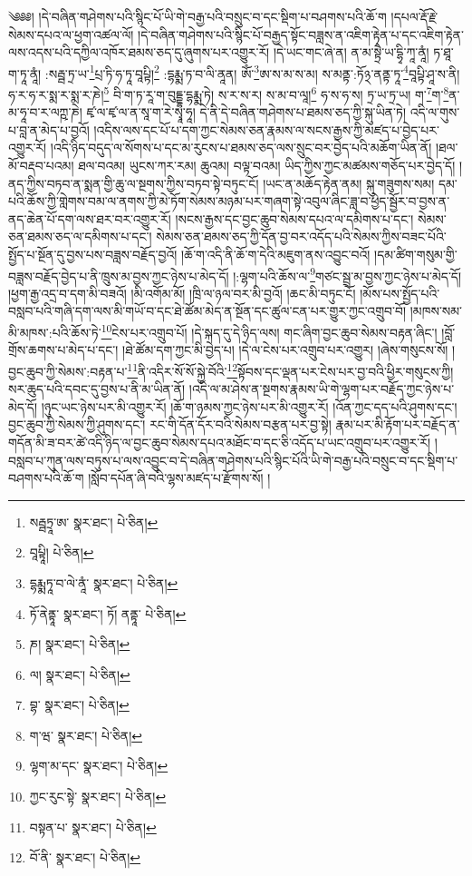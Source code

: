 \setcounter{footnote}{0} 
༄༅༅། །དེ་བཞིན་གཤེགས་པའི་སྙིང་པོ་ཡི་གེ་བརྒྱ་པའི་བསྲུང་བ་དང་སྡིག་པ་བཤགས་པའི་ཆོ་ག །དཔལ་རྡོ་རྗེ་སེམས་དཔའ་ལ་ཕྱག་འཚལ་ལོ། །དེ་བཞིན་གཤེགས་པའི་སྙིང་པོ་བརྒྱད་སྟོང་བཟླས་ན་འཇིག་རྟེན་པ་དང་འཇིག་རྟེན་ལས་འདས་པའི་དཀྱིལ་འཁོར་ཐམས་ཅད་དུ་ཞུགས་པར་འགྱུར་རོ། །དེ་ཡང་གང་ཞེ་ན། ན་མ་སྟྲཻ་ཡ་དྷྭི་ཀཱ་ནཱཾ། ཏ་ཐཱ་ག་ཏཱ་ནཱཾ། :སརྦྦ་ཏྲ་ཡ་\footnote{སརྦྦཏྲཱ་ཨ་  སྣར་ཐང་།  པེ་ཅིན། }པྲ་ཏི་ཧ་ཏཱ་བཱཔྟི།\footnote{བཱཔྟཱི།  པེ་ཅིན། } :དྷརྨྨ་ཏ་བ་ལི་ནཱན། ཨོཾ་\footnote{དྷརྨྨཏཱ་བ་ལེ་ནཱཾ་  སྣར་ཐང་།  པེ་ཅིན། }ཨ་ས་མ་ས་མ། ས་མནྟ་:ཏོ྅་ནནྟ་ཏཱ་\footnote{ཏོ་ནེནྟཱ་  སྣར་ཐང་། ཏོ། ནནྟཱ་  པེ་ཅིན། }བཱཔྟི་ཤཱ་ས་ནི། ཧ་ར་ཧ་ར་སྨ་ར་སྨ་ར་ཎེ།\footnote{ཎ།  སྣར་ཐང་།  པེ་ཅིན། } བི་ག་ཏ་རཱ་ག་བུདྡྷ་དྷརྨྨ་ཏེ། ས་ར་ས་ར། ས་མ་བ་ལཱ།\footnote{ལ།  སྣར་ཐང་།  པེ་ཅིན། } ཧ་ས་ཧ་ས། ཏྲ་ཡ་ཏྲ་ཡ། ག་\footnote{བྷ་  སྣར་ཐང་།  པེ་ཅིན། }ག་\footnote{ག་ཝ་  སྣར་ཐང་།  པེ་ཅིན། }ན་མ་ཧཱ་བ་ར་ལཀྵ་ཎེ། ཛྭ་ལ་ཛྭ་ལ་ན་སཱ་ག་རེ་སྭཱ་ཧཱ། དེ་ནི་དེ་བཞིན་གཤེགས་པ་ཐམས་ཅད་ཀྱི་སྐུ་ཡིན་ཏེ། འདི་ལ་གུས་པ་བླ་ན་མེད་པ་བྱའོ། །འདིས་ལས་དང་པོ་པ་དག་ཀྱང་སེམས་ཅན་རྣམས་ལ་སངས་རྒྱས་ཀྱི་མཛད་པ་བྱེད་པར་འགྱུར་རོ། །འདི་ཉིད་བདུད་ལ་སོགས་པ་དང་མ་རུངས་པ་ཐམས་ཅད་ལས་སྲུང་བར་བྱེད་པའི་མཆོག་ཡིན་ནོ། །ཐལ་མོ་བརྡབ་པའམ། ཐལ་བའམ། ཡུངས་ཀར་རམ། ཆུའམ། བལྟ་བའམ། ཡིད་ཀྱིས་ཀྱང་མཚམས་གཅོད་པར་བྱེད་དོ། །ནད་ཀྱིས་བཏབ་ན་སྨན་གྱི་ཆུ་ལ་སྔགས་ཀྱིས་བཏབ་སྟེ་བཏུང་ངོ། །ཡང་ན་མཆོད་རྟེན་ནམ། སྐུ་གཟུགས་སམ། དམ་པའི་ཆོས་ཀྱི་གླེགས་བམ་ལ་ནགས་ཀྱི་མེ་ཏོག་སེམས་མཉམ་པར་གཞག་སྟེ་འབུལ་ཞིང་ཟླ་བ་ཕྱེད་སྦྱོར་བ་བྱས་ན་ནད་ཆེན་པོ་དག་ལས་ཐར་བར་འགྱུར་རོ། །སངས་རྒྱས་དང་བྱང་ཆུབ་སེམས་དཔའ་ལ་དམིགས་པ་དང་། སེམས་ཅན་ཐམས་ཅད་ལ་དམིགས་པ་དང་། སེམས་ཅན་ཐམས་ཅད་ཀྱི་དོན་བྱ་བར་འདོད་པའི་སེམས་ཀྱིས་བཟང་པོའི་སྤྱོད་པ་སྔོན་དུ་བྱས་པས་བཟླས་བརྗོད་བྱའོ། །ཆོ་ག་འདི་ནི་ཆོ་ག་དེའི་མཇུག་ནས་འབྱུང་བའོ། །དམ་ཚིག་གསུམ་གྱི་བཟླས་བརྗོད་བྱེད་པ་ནི་ཁྲུས་མ་བྱས་ཀྱང་ཉེས་པ་མེད་དོ། །:ལྷག་པའི་ཆོས་ལ་\footnote{ལྷག་མ་དང་  སྣར་ཐང་།  པེ་ཅིན། }གཙང་སྦྲ་མ་བྱས་ཀྱང་ཉེས་པ་མེད་དོ། །ཕྱག་རྒྱ་འདྲ་བ་དག་མི་བཟའོ། །མི་འགོམ་མོ། །ཁྲི་ལ་ཉལ་བར་མི་བྱའོ། །ཆང་མི་བཏུང་ངོ། །མོས་པས་སྤྱོད་པའི་བསླབ་པའི་གཞི་དག་ལས་མི་གཡོ་བ་དང་ཐེ་ཚོམ་མེད་ན་སྔོན་དང་ཚུལ་ངན་པར་གྱུར་ཀྱང་འགྲུབ་བོ། །མཁས་སམ་མི་མཁས་:པའི་ཆོས་ཏེ་\footnote{ཀྱང་རུང་སྟེ་  སྣར་ཐང་།  པེ་ཅིན། }ངེས་པར་འགྲུབ་པོ། །དེ་སྐད་དུ་དེ་ཉིད་ལས། གང་ཞིག་བྱང་ཆུབ་སེམས་བརྟན་ཞིང་། །བློ་གྲོས་ཆགས་པ་མེད་པ་དང་། །ཐེ་ཚོམ་དག་ཀྱང་མི་བྱེད་པ། །དེ་ལ་ངེས་པར་འགྲུབ་པར་འགྱུར། །ཞེས་གསུངས་སོ། །བྱང་ཆུབ་ཀྱི་སེམས་:བརྟན་པ་\footnote{བསྟན་པ་  སྣར་ཐང་།  པེ་ཅིན། }ནི་འདིར་སོ་སོ་སྐྱེ་བོའི་\footnote{བོ་ནི་  སྣར་ཐང་།  པེ་ཅིན། }སྟོབས་དང་ལྡན་པར་ངེས་པར་བྱ་བའི་ཕྱིར་གསུངས་ཀྱི། སར་ཆུད་པའི་དབང་དུ་བྱས་པ་ནི་མ་ཡིན་ནོ། །འདི་ལ་མ་ཤེས་ན་སྔགས་རྣམས་ཡི་གེ་ལྷག་པར་བརྗོད་ཀྱང་ཉེས་པ་མེད་དོ། །ཉུང་ཡང་ཉེས་པར་མི་འགྱུར་རོ། །ཆོ་ག་ཉམས་ཀྱང་ཉེས་པར་མི་འགྱུར་རོ། །འོན་ཀྱང་དད་པའི་ཤུགས་དང་། བྱང་ཆུབ་ཀྱི་སེམས་ཀྱི་ཤུགས་དང་། རང་གི་དོན་དོར་བའི་སེམས་བརྩན་པར་བྱ་སྟེ། རྣམ་པར་མི་རྟོག་པར་བརྗོད་ན་གདོན་མི་ཟ་བར་ཚེ་འདི་ཉིད་ལ་བྱང་ཆུབ་སེམས་དཔའ་མཐོང་བ་དང་ཅི་འདོད་པ་ཡང་འགྲུབ་པར་འགྱུར་རོ། །བསླབ་པ་ཀུན་ལས་བཏུས་པ་ལས་འབྱུང་བ་དེ་བཞིན་གཤེགས་པའི་སྙིང་པོའི་ཡི་གེ་བརྒྱ་པའི་བསྲུང་བ་དང་སྡིག་པ་བཤགས་པའི་ཆོ་ག །སློབ་དཔོན་ཞི་བའི་ལྷས་མཛད་པ་རྫོགས་སོ། ། 